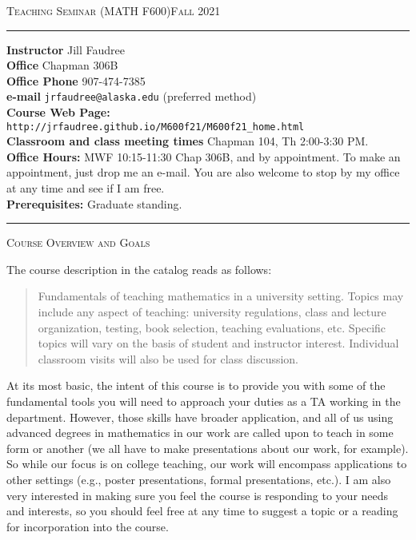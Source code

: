 \documentclass[12pt]{article}
\begin{document}
\normalem
\begin{center}
 \textsc{Teaching Seminar (MATH F600)\hfill Fall 2021}
\end{center}

\rule{\textwidth}{.1pt}

\textbf{Instructor} Jill Faudree\\
\textbf{Office} Chapman 306B\\
\textbf{Office Phone} 907-474-7385\\
\textbf{e-mail} {\tt jrfaudree@alaska.edu} (preferred method)\\
\textbf{Course Web Page:} {\tt http://jrfaudree.github.io/M600f21/M600f21\_home.html}\\
\textbf{Classroom and class meeting times} Chapman 104, Th 2:00-3:30 PM. \\
\textbf{Office Hours:}  MWF 10:15-11:30 Chap 306B, and by appointment. To make an appointment, just drop me an e-mail. You are also welcome to stop by my office at any time and see if I am free.\\
\textbf{Prerequisites:} Graduate standing.

\rule{\textwidth}{.1pt}  

\textsc{Course Overview and Goals} 

The course description in the catalog reads as follows:
\begin{quote}Fundamentals of teaching mathematics in a university setting. Topics may include any aspect of teaching: university regulations, class and lecture organization, testing, book selection, teaching evaluations, etc. Specific topics will vary on the basis of student and instructor interest. Individual classroom visits will also be used for class discussion.\end{quote}
At its most basic, the intent of this course is to provide you with some of the fundamental tools you will need to approach your duties as a TA working in the department. However, those skills have broader application, and all of us using advanced degrees in mathematics in our work are called upon to teach in some form or another (we all have to make presentations about our work, for example). So while our focus is on college teaching, our work will encompass  applications to other settings (e.g., poster presentations, formal presentations, etc.). I am also very interested in making sure you feel the course is responding to your needs and interests, so you should feel free at any time to suggest a topic or a reading for incorporation into the course.
 
\end{document}
